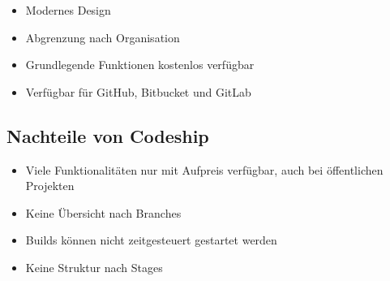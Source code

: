 \begin{itemize}
  \item Modernes Design
  \item Abgrenzung nach Organisation
  \item Grundlegende Funktionen kostenlos verfügbar
  \item Verfügbar für GitHub, Bitbucket und GitLab
\end{itemize}

\subsection*{Nachteile von Codeship}

\begin{itemize}
  \item Viele Funktionalitäten nur mit Aufpreis verfügbar, auch bei öffentlichen Projekten
  \item Keine Übersicht nach Branches
  \item Builds können nicht zeitgesteuert gestartet werden
  \item Keine Struktur nach Stages
\end{itemize}

